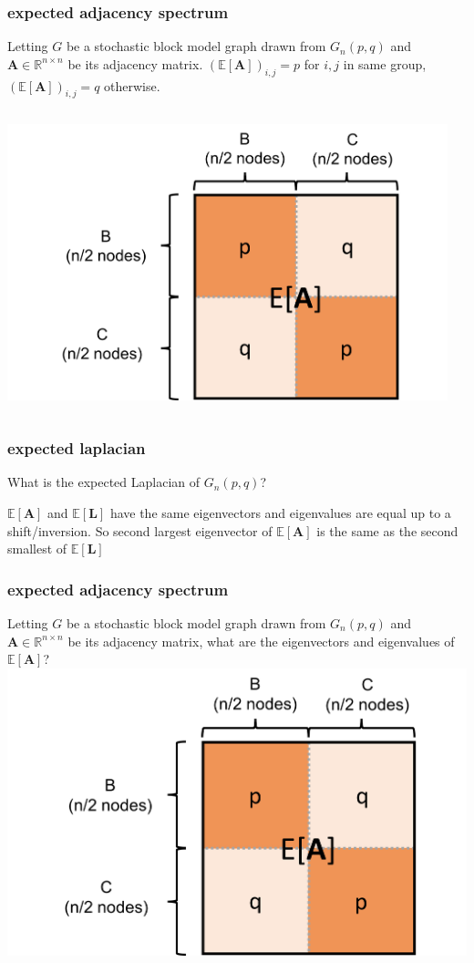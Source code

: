 \documentclass[compress]{beamer}
\newcommand{\bv}[1]{\mathbf{#1}}
\newcommand{\R}{\mathbb{R}}
\newcommand{\E}{\mathbb{E}}
\begin{document}
\begin{frame}
	\frametitle{expected adjacency spectrum}
	Letting $G$ be a stochastic block model graph drawn from $G_n(p,q)$ and $\bv A \in \R^{n \times n}$ be its adjacency matrix. $(\E[\bv A])_{i,j} = p$ for $i,j$ in same group, $(\E[\bv A])_{i,j} = q$ otherwise. 
	\begin{columns}
		\begin{column}{.6\textwidth}
			\begin{center}
				\includegraphics[width=1\textwidth]{expA.png}
			\end{center}
		\end{column}
		\begin{column}{.4\textwidth}
		\end{column}
	\end{columns}
\end{frame}

\begin{frame}
	\frametitle{expected laplacian}
	\begin{center}
		What is the expected Laplacian of $G_n(p,q)$?
		\vspace{14em}
		
		
		$\E[\bv{A}]$ and $\E[\bv{L}]$ have the same eigenvectors and eigenvalues are equal up to a shift/inversion. So second largest eigenvector of $\E[\bv{A}]$ is the same as the second smallest of $\E[\bv{L}]$
	\end{center}
\end{frame}

\begin{frame}[t]
	\frametitle{expected adjacency spectrum}
	Letting $G$ be a stochastic block model graph drawn from $G_n(p,q)$ and $\bv A \in \R^{n \times n}$ be its adjacency matrix, what are the eigenvectors and eigenvalues of $\E[\bv{A}]$?
	\vspace{1em}
	\includegraphics[width=.5\textwidth]{expA.png}
\end{frame}
\end{document}
